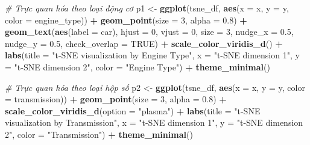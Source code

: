 \documentclass[
]{article}
\newenvironment{Shaded}{\begin{snugshade}}{\end{snugshade}}
\newcommand{\AttributeTok}[1]{\textcolor[rgb]{0.13,0.29,0.53}{#1}}
\newcommand{\CommentTok}[1]{\textcolor[rgb]{0.56,0.35,0.01}{\textit{#1}}}
\newcommand{\ConstantTok}[1]{\textcolor[rgb]{0.56,0.35,0.01}{#1}}
\newcommand{\DecValTok}[1]{\textcolor[rgb]{0.00,0.00,0.81}{#1}}
\newcommand{\FloatTok}[1]{\textcolor[rgb]{0.00,0.00,0.81}{#1}}
\newcommand{\FunctionTok}[1]{\textcolor[rgb]{0.13,0.29,0.53}{\textbf{#1}}}
\newcommand{\NormalTok}[1]{#1}
\newcommand{\OtherTok}[1]{\textcolor[rgb]{0.56,0.35,0.01}{#1}}
\newcommand{\SpecialCharTok}[1]{\textcolor[rgb]{0.81,0.36,0.00}{\textbf{#1}}}
\newcommand{\StringTok}[1]{\textcolor[rgb]{0.31,0.60,0.02}{#1}}
\begin{document}
\begin{Shaded}
\begin{Highlighting}[]
\CommentTok{\# Trực quan hóa theo loại động cơ}
\NormalTok{p1 }\OtherTok{\textless{}{-}} \FunctionTok{ggplot}\NormalTok{(tsne\_df, }\FunctionTok{aes}\NormalTok{(}\AttributeTok{x =}\NormalTok{ x, }\AttributeTok{y =}\NormalTok{ y, }\AttributeTok{color =}\NormalTok{ engine\_type)) }\SpecialCharTok{+}
  \FunctionTok{geom\_point}\NormalTok{(}\AttributeTok{size =} \DecValTok{3}\NormalTok{, }\AttributeTok{alpha =} \FloatTok{0.8}\NormalTok{) }\SpecialCharTok{+}
  \FunctionTok{geom\_text}\NormalTok{(}\FunctionTok{aes}\NormalTok{(}\AttributeTok{label =}\NormalTok{ car), }\AttributeTok{hjust =} \DecValTok{0}\NormalTok{, }\AttributeTok{vjust =} \DecValTok{0}\NormalTok{, }\AttributeTok{size =} \DecValTok{3}\NormalTok{, }\AttributeTok{nudge\_x =} \FloatTok{0.5}\NormalTok{, }\AttributeTok{nudge\_y =} \FloatTok{0.5}\NormalTok{, }\AttributeTok{check\_overlap =} \ConstantTok{TRUE}\NormalTok{) }\SpecialCharTok{+}
  \FunctionTok{scale\_color\_viridis\_d}\NormalTok{() }\SpecialCharTok{+}
  \FunctionTok{labs}\NormalTok{(}\AttributeTok{title =} \StringTok{"t{-}SNE visualization by Engine Type"}\NormalTok{,}
       \AttributeTok{x =} \StringTok{"t{-}SNE dimension 1"}\NormalTok{,}
       \AttributeTok{y =} \StringTok{"t{-}SNE dimension 2"}\NormalTok{,}
       \AttributeTok{color =} \StringTok{"Engine Type"}\NormalTok{) }\SpecialCharTok{+}
  \FunctionTok{theme\_minimal}\NormalTok{()}

\CommentTok{\# Trực quan hóa theo loại hộp số}
\NormalTok{p2 }\OtherTok{\textless{}{-}} \FunctionTok{ggplot}\NormalTok{(tsne\_df, }\FunctionTok{aes}\NormalTok{(}\AttributeTok{x =}\NormalTok{ x, }\AttributeTok{y =}\NormalTok{ y, }\AttributeTok{color =}\NormalTok{ transmission)) }\SpecialCharTok{+}
  \FunctionTok{geom\_point}\NormalTok{(}\AttributeTok{size =} \DecValTok{3}\NormalTok{, }\AttributeTok{alpha =} \FloatTok{0.8}\NormalTok{) }\SpecialCharTok{+}
  \FunctionTok{scale\_color\_viridis\_d}\NormalTok{(}\AttributeTok{option =} \StringTok{"plasma"}\NormalTok{) }\SpecialCharTok{+}
  \FunctionTok{labs}\NormalTok{(}\AttributeTok{title =} \StringTok{"t{-}SNE visualization by Transmission"}\NormalTok{,}
       \AttributeTok{x =} \StringTok{"t{-}SNE dimension 1"}\NormalTok{,}
       \AttributeTok{y =} \StringTok{"t{-}SNE dimension 2"}\NormalTok{,}
       \AttributeTok{color =} \StringTok{"Transmission"}\NormalTok{) }\SpecialCharTok{+}
  \FunctionTok{theme\_minimal}\NormalTok{()}


\end{Highlighting}
\end{Shaded}
\end{document}
